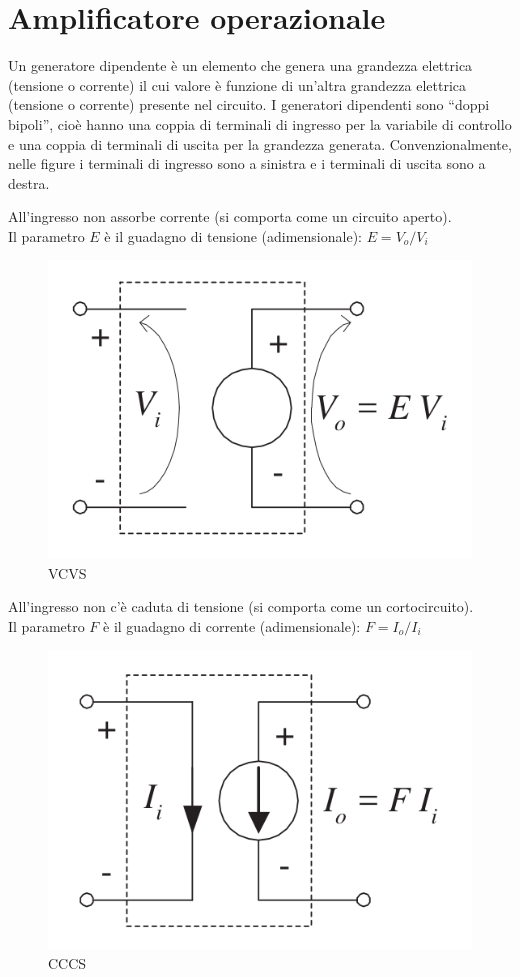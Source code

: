 \section{Amplificatore operazionale}

\begin{defn}
    Un generatore dipendente è un elemento che genera una grandezza elettrica (tensione o corrente) il cui valore è funzione di
    un'altra grandezza elettrica (tensione o corrente) presente nel circuito.
    I generatori dipendenti sono “doppi bipoli”, cioè hanno una coppia di terminali di ingresso per la variabile di controllo e 
    una coppia di terminali di uscita per la grandezza generata. 
    Convenzionalmente, nelle figure i terminali di ingresso sono a sinistra e i terminali di uscita sono a destra.
\end{defn}

\begin{defn}
	All'ingresso non assorbe corrente (si comporta come un circuito aperto).\\
	Il parametro $E$ è il guadagno di tensione (adimensionale): $E = V_o / V_i$
	\begin{figure}[H]
		\centering
		\includegraphics[width=0.5\linewidth]{figures/VCVS.png}
		\caption{VCVS}
		\label{fig:VCVS}
	\end{figure}
\end{defn}

\begin{defn}
	All'ingresso non c'è caduta di tensione (si comporta come un cortocircuito). \\
	Il parametro $F$ è il guadagno di corrente (adimensionale): $F = I_o / I_i$
	\begin{figure}[H]
		\centering
		\includegraphics[width=0.5\linewidth]{figures/CCCS.png}
		\caption{CCCS}
		\label{fig:CCCS}
	\end{figure}
\end{defn}

